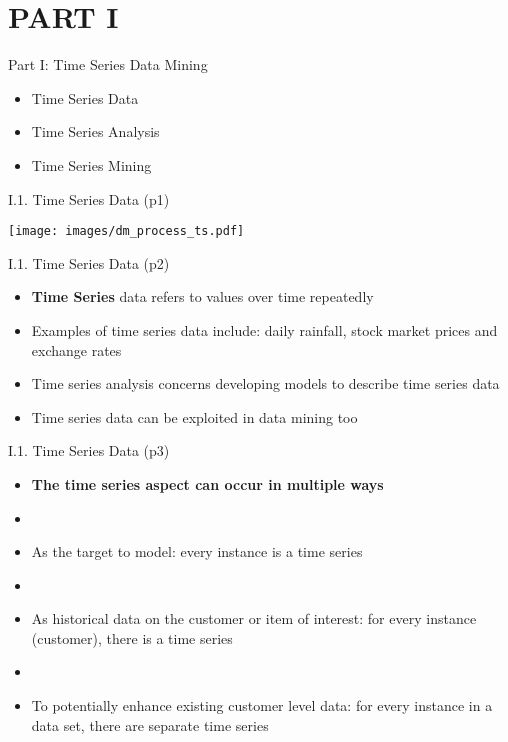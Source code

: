 \documentclass[handout]{beamer}
\newcommand{\strong}[1]{\textbf{\color{teal} #1}}
\newcommand{\stronger}[1]{\textbf{\color{purple} #1}}
\begin{document}
\section{PART I}
\begin{frame}{Part I: Time Series Data Mining}
\begin{itemize}
\item[I.1.] Time Series Data
\item[I.2.] Time Series Analysis
\item[I.3.] Time Series Mining
\end{itemize}
\end{frame}
\begin{frame}{I.1. Time Series Data (p1)}
\begin{center}
\texttt{[image: images/dm\_process\_ts.pdf]}
\end{center}
\end{frame}
\begin{frame}{I.1. Time Series Data (p2)}
\begin{itemize}
\item \stronger{Time Series} data refers to values over time repeatedly
\item Examples of time series data include: daily rainfall, stock market prices and exchange rates
\item Time series analysis concerns developing models to describe time series data
\item Time series data can be exploited in data mining too
\end{itemize}
\end{frame}
\begin{frame}{I.1. Time Series Data (p3)}
\begin{itemize}
\item[] \strong{The time series aspect can occur in multiple ways}
\item[]
\item As the target to model: every instance is a time series
\item[]
\item As historical data on the customer or item of interest: for every instance (customer), there is a time series
\item[]
\item To potentially enhance existing customer level data: for every instance in a data set, there are separate time series
\end{itemize}
\end{frame}
\end{document}
